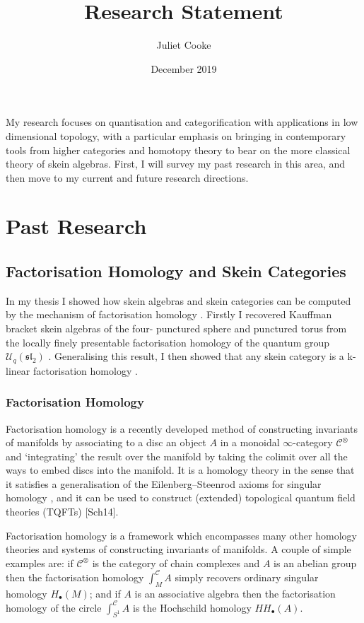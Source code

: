 \documentclass{article}
\title{Research Statement}
\author{Juliet Cooke}
\date{December 2019}
\newcommand{\slgroup}{\mathfrak{sl}}
\begin{document}
\maketitle

My research focuses on quantisation and categorification with applications in low dimensional topology, with a particular emphasis on bringing in contemporary tools from higher categories and homotopy theory to bear on the more classical theory of skein algebras.
First, I will survey my past research in this area, and then move to my current and future research directions.

\section{Past Research}
\subsection{Factorisation Homology and Skein Categories}

In my thesis I showed how skein algebras and skein categories can be computed by the mechanism of factorisation homology \cite{CookeThesis}. Firstly I recovered Kauffman bracket skein algebras of the four- punctured sphere and punctured torus from the locally finely presentable factorisation homology of the quantum group $\mathcal{U}_q(\slgroup_2)$ \cite{C1}. Generalising this result, I then showed that any skein category is a k-linear factorisation homology \cite{C2}.

\subsubsection{Factorisation Homology}

Factorisation homology is a recently developed method of constructing invariants of manifolds by associating to a disc an object $A$ in a monoidal $\infty$-category $\mathscr{C}^{\otimes}$ and ‘integrating’ the result over the manifold by taking the colimit over all the ways to embed discs into the manifold. It is a homology theory in the sense that it satisfies a generalisation of the Eilenberg–Steenrod axioms for singular homology \cite{AyalaFrancis2015}, and it can be used to construct (extended) topological quantum field theories (TQFTs) [Sch14]. 

Factorisation homology is a framework which encompasses many other homology theories and systems of constructing invariants of manifolds. A couple of simple examples are: if $\mathscr{C}^{\otimes}$ is the category of chain complexes and $A$ is an abelian group then the factorisation homology $\int^{\mathscr{C}}_M A$ simply recovers ordinary singular homology $H_{\bullet}(M)$; and if $A$ is an associative algebra then the factorisation homology of the circle $\int^{\mathscr{C}}_{S^1} A$ is the Hochschild homology $HH_{\bullet}(A)$. 
\end{document}
